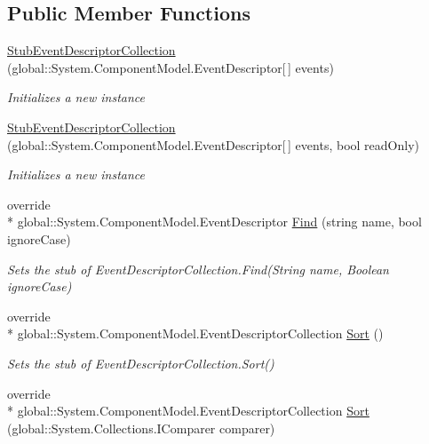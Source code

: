 \subsection*{Public Member Functions}
\begin{DoxyCompactItemize}
\item 
\hyperlink{class_system_1_1_component_model_1_1_fakes_1_1_stub_event_descriptor_collection_a977e2caa1217eac374013fe479cde0cd}{Stub\-Event\-Descriptor\-Collection} (global\-::\-System.\-Component\-Model.\-Event\-Descriptor\mbox{[}$\,$\mbox{]} events)
\begin{DoxyCompactList}\small\item\em Initializes a new instance\end{DoxyCompactList}\item 
\hyperlink{class_system_1_1_component_model_1_1_fakes_1_1_stub_event_descriptor_collection_a8b67c80e49e32d7d7afcb66a3dc0260b}{Stub\-Event\-Descriptor\-Collection} (global\-::\-System.\-Component\-Model.\-Event\-Descriptor\mbox{[}$\,$\mbox{]} events, bool read\-Only)
\begin{DoxyCompactList}\small\item\em Initializes a new instance\end{DoxyCompactList}\item 
override \\*
global\-::\-System.\-Component\-Model.\-Event\-Descriptor \hyperlink{class_system_1_1_component_model_1_1_fakes_1_1_stub_event_descriptor_collection_a7b08bbc95b3f3ae459ff6626e13ce35a}{Find} (string name, bool ignore\-Case)
\begin{DoxyCompactList}\small\item\em Sets the stub of Event\-Descriptor\-Collection.\-Find(\-String name, Boolean ignore\-Case)\end{DoxyCompactList}\item 
override \\*
global\-::\-System.\-Component\-Model.\-Event\-Descriptor\-Collection \hyperlink{class_system_1_1_component_model_1_1_fakes_1_1_stub_event_descriptor_collection_aae401b8bc2e7ed5ec50228feb4be5394}{Sort} ()
\begin{DoxyCompactList}\small\item\em Sets the stub of Event\-Descriptor\-Collection.\-Sort()\end{DoxyCompactList}\item 
override \\*
global\-::\-System.\-Component\-Model.\-Event\-Descriptor\-Collection \hyperlink{class_system_1_1_component_model_1_1_fakes_1_1_stub_event_descriptor_collection_a63f63540b11e072822ff85e62a3f007a}{Sort} (global\-::\-System.\-Collections.\-I\-Comparer comparer)

\end{DoxyCompactItemize}
